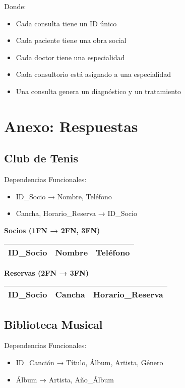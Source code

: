 \documentclass[12pt]{article}
\begin{document}
\vspace{1em}
Donde:
\begin{itemize}
    \item Cada consulta tiene un ID único
    \item Cada paciente tiene una obra social
    \item Cada doctor tiene una especialidad
    \item Cada consultorio está asignado a una especialidad
    \item Una consulta genera un diagnóstico y un tratamiento
\end{itemize}

\newpage

\section{Anexo: Respuestas}

\subsection{Club de Tenis}

Dependencias Funcionales:
\begin{itemize}
    \item ID\_Socio → Nombre, Teléfono
    \item Cancha, Horario\_Reserva → ID\_Socio
\end{itemize}

\textbf{Socios (1FN → 2FN, 3FN)}
\begin{center}
\begin{tabular}{|l|l|l|}
\hline
ID\_Socio & Nombre & Teléfono \\
\hline
\end{tabular}
\end{center}

\textbf{Reservas (2FN → 3FN)}
\begin{center}
\begin{tabular}{|l|l|l|}
\hline
ID\_Socio & Cancha & Horario\_Reserva \\
\hline
\end{tabular}
\end{center}

\subsection{Biblioteca Musical}

Dependencias Funcionales:
\begin{itemize}
    \item ID\_Canción → Título, Álbum, Artista, Género
    \item Álbum → Artista, Año\_Álbum
\end{itemize}
\end{document}

